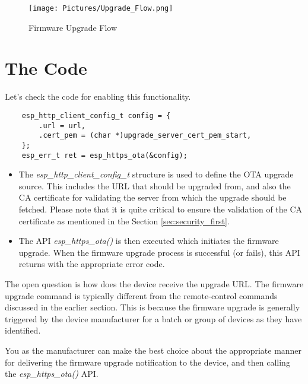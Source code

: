 \documentclass[main.tex]{subfiles}
\begin{document}
\begin{figure}[h!]
    \centering
    \texttt{[image: Pictures/Upgrade\_Flow.png]}
    \caption{Firmware Upgrade Flow}
    \label{fig:ota_workflow}
\end{figure}

\section{The Code}
Let's check the code for enabling this functionality.

\begin{verbatim}
    esp_http_client_config_t config = {
        .url = url,
        .cert_pem = (char *)upgrade_server_cert_pem_start,
    };
    esp_err_t ret = esp_https_ota(&config);
\end{verbatim}

\begin{itemize}
    \item The \textit{esp\_http\_client\_config\_t} structure is used to define the OTA upgrade source. This includes the URL that should be upgraded from, and also the CA certificate for validating the server from which the upgrade should be fetched. Please note that it is quite critical to ensure the validation of the CA certificate as mentioned in the Section \ref{sec:security_first}.
    \item The API \textit{esp\_https\_ota()} is then executed which initiates the firmware upgrade. When the firmware upgrade process is successful (or fails), this API returns with the appropriate error code.
\end{itemize}

The open question is how does the device receive the upgrade URL. The firmware upgrade command is typically different from the remote-control commands discussed in the earlier section. This is because the firmware upgrade is generally triggered by the device manufacturer for a batch or group of devices as they have identified.

You as the manufacturer can make the best choice about the appropriate manner for delivering the firmware upgrade notification to the device, and then calling the \textit{esp\_https\_ota()} API.
\end{document}
